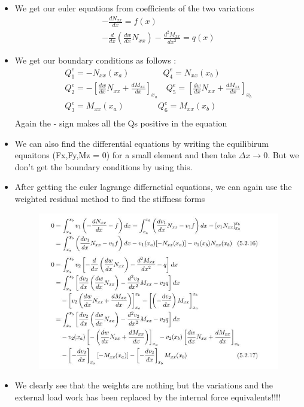 	\begin{frame}
		\begin{itemize}
			\item We get our euler equations from coefficients of the two variations
			\begin{equation}
			\begin{aligned}
				-\frac{dN_{xx}}{dx} = f(x) \\
				-\frac{d}{dx}\left(\frac{dw}{dx}N_{xx} \right) - \frac{d^2 M_{xx}}{dx^2} = q(x)
			\end{aligned}
			\end{equation}
			\item We get our boundary conditions as follows :
			\begin{equation}
			\begin{aligned}
			  Q_1^e = -N_{xx}(x_a) \qquad \qquad Q_4^e = N_{xx}(x_b) \\
			  Q_2^e = -\left[ \frac{dw}{dx}N_{xx} + \frac{dM_{xx}}{dx}\right]_{x_a} \quad 
			  Q_5^e = \left[ \frac{dw}{dx}N_{xx} + \frac{dM_{xx}}{dx}\right]_{x_b} \\
			  Q_3^e = M_{xx}(x_a) \qquad\qquad  Q_6^e = M_{xx}(x_b) \\
			\end{aligned}
			\end{equation}
			Again the - sign makes all the Qs positive in the equation
		\end{itemize}
	\end{frame}


	\begin{frame}
		\begin{itemize}
			\item We can also find the differential equations by writing the equilibirum equaitons (Fx,Fy,Mz = 0) for a small element and then take $\Delta x \rightarrow 0$. But we don't get the boundary conditions by using this. 
			\item After getting the euler lagrange differnetial equations, we can again use the weighted residual method to find the stiffness forms
			\begin{figure}
				\centering
				\includegraphics[width=0.8 \linewidth]{Figure/fig20} 		
			\end{figure}
			\item We clearly see that the weights are nothing but the variations and the external load work has been replaced by the internal force equivalents!!!!
		\end{itemize}
	\end{frame}


